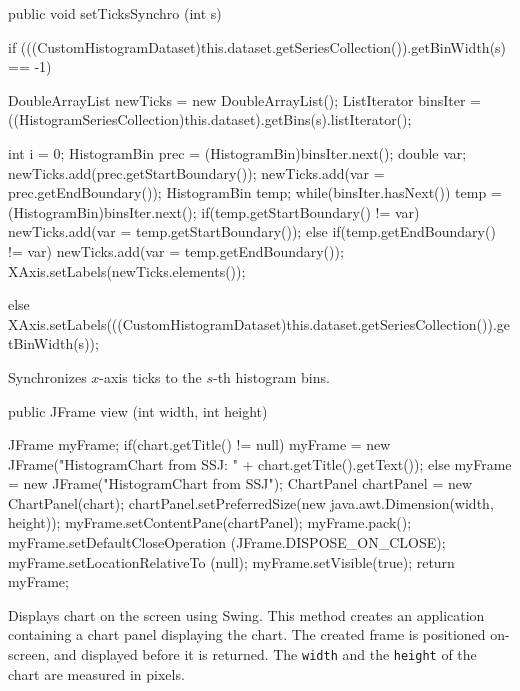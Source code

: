 \begin{code}

   public void setTicksSynchro (int s) \begin{hide} {
      if (((CustomHistogramDataset)this.dataset.getSeriesCollection()).getBinWidth(s) == -1){
         DoubleArrayList newTicks = new DoubleArrayList();
         ListIterator binsIter = ((HistogramSeriesCollection)this.dataset).getBins(s).listIterator();

         int i = 0;
         HistogramBin prec = (HistogramBin)binsIter.next();
         double var;
         newTicks.add(prec.getStartBoundary());
         newTicks.add(var = prec.getEndBoundary());
         HistogramBin temp;
         while(binsIter.hasNext()) {
            temp = (HistogramBin)binsIter.next();
            if(temp.getStartBoundary() != var) {
               newTicks.add(var = temp.getStartBoundary());
            } else if(temp.getEndBoundary() != var) {
               newTicks.add(var = temp.getEndBoundary());
            }
         }
         XAxis.setLabels(newTicks.elements());
      }
      else {
         XAxis.setLabels(((CustomHistogramDataset)this.dataset.getSeriesCollection()).getBinWidth(s));
      }
   }\end{hide}
\end{code}
\begin{tabb}
   Synchronizes $x$-axis ticks to the $s$-th histogram bins.
\end{tabb}
\begin{htmlonly}
\end{htmlonly}
\begin{code}

   public JFrame view (int width, int height) \begin{hide} {
      JFrame myFrame;
      if(chart.getTitle() != null)
         myFrame = new JFrame("HistogramChart from SSJ: " + chart.getTitle().getText());
      else
         myFrame = new JFrame("HistogramChart from SSJ");
      ChartPanel chartPanel = new ChartPanel(chart);
      chartPanel.setPreferredSize(new java.awt.Dimension(width, height));
      myFrame.setContentPane(chartPanel);
      myFrame.pack();
      myFrame.setDefaultCloseOperation (JFrame.DISPOSE_ON_CLOSE);
      myFrame.setLocationRelativeTo (null);
      myFrame.setVisible(true);
      return myFrame;
   }\end{hide}
\end{code}
\begin{tabb}
   Displays chart on the screen using Swing.
   This method creates an application containing a chart panel displaying
   the chart. The created frame is positioned on-screen, and displayed before
   it is returned. The \texttt{width} and the \texttt{height}
   of the chart are measured in pixels.
\end{tabb}
\begin{htmlonly}
\end{htmlonly}

